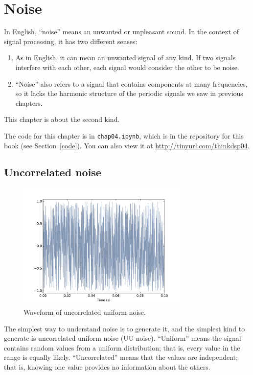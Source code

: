 \documentclass[12pt]{book}
\begin{document}
\chapter{Noise}

In English, ``noise'' means an unwanted or unpleasant sound.  In the
context of signal processing, it has two different senses:

\begin{enumerate}

\item As in English, it can mean an unwanted signal of any kind.  If
two signals interfere with each other, each signal would consider
the other to be noise.

\item ``Noise'' also refers to a signal that contains components at
many frequencies, so it lacks the harmonic structure of the periodic
signals we saw in previous chapters.  

\end{enumerate}

This chapter is about the second kind.

The code for this chapter is in {\tt chap04.ipynb}, which is in the
repository for this book (see Section~\ref{code}).
You can also view it at \url{http://tinyurl.com/thinkdsp04}.


\section{Uncorrelated noise}

\begin{figure}
\centerline{\includegraphics[height=2.5in]{figs/whitenoise0.pdf}}
\caption{Waveform of uncorrelated uniform noise.}
\label{fig.whitenoise0}
\end{figure}

The simplest way to understand noise is to generate it, and the
simplest kind to generate is uncorrelated uniform noise (UU noise).
``Uniform'' means the signal contains random values from a uniform
distribution; that is, every value in the range is equally likely.
``Uncorrelated'' means that the values are independent; that is,
knowing one value provides no information about the others.
\end{document}
